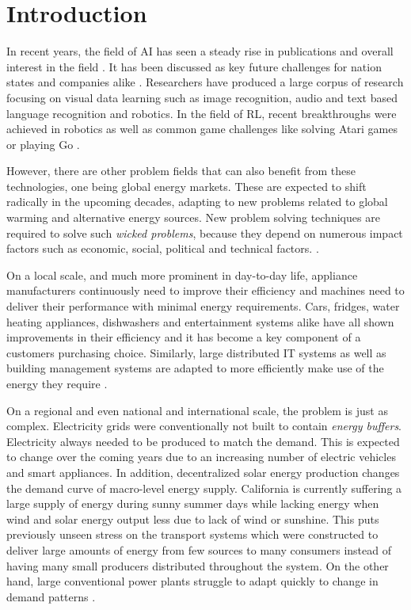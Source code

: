 \chapter{Introduction}


In recent years, the field of \ac{AI} has seen a steady rise in publications and overall interest in the field
\cite[]{arulkumaran2017brief, russell2016artificial}.
It has been discussed as key future challenges for nation states and companies alike
\cite[]{mozur_markoff_2017, faznetchina_2018}. Researchers have produced a large corpus of research focusing on visual
data learning such as image recognition, audio and text based language recognition and robotics. In the field of
\ac{RL}, recent breakthroughs were achieved in robotics as well as common game challenges like solving Atari games or
playing Go
\cite[]{arulkumaran2017brief}.

However, there are other problem fields that can also benefit from these technologies, one being global energy markets.
These are expected to shift radically in the upcoming decades, adapting to new problems related to global warming and
alternative energy sources. New problem solving techniques are required to solve such \emph{wicked
problems}, because they depend on numerous impact factors such as economic, social, political and technical factors.
\cite[]{ketter2015competitive}.

On a local scale, and much more prominent in day-to-day life, appliance manufacturers continuously need to improve their
efficiency and machines need to deliver their performance with minimal energy requirements. Cars, fridges, water heating
appliances, dishwashers and entertainment systems alike have all shown improvements in their efficiency and it has
become a key component of a customers purchasing choice.  Similarly, large distributed IT systems as well as building
management systems are adapted to more efficiently make use of the energy they require
\cite[]{Orgerie:2014:STI:2597757.2532637, DePaola:2014:IMS:2620784.2611779}.

On a regional and even national and international scale, the problem is just as complex. Electricity grids were
conventionally not built to contain \emph{energy buffers}. Electricity always needed to be produced to match the demand. This
is expected to change over the coming years due to an increasing number of electric vehicles and smart appliances. In
addition, decentralized solar energy production changes the demand curve of macro-level energy supply. California is
currently suffering a large supply of energy during sunny summer days while lacking energy when wind and solar energy
output less due to lack of wind or sunshine. This puts previously unseen stress on the transport systems which were
constructed to deliver large amounts of energy from few sources to many consumers instead of having many small producers
distributed throughout the system. On the other hand, large conventional power plants struggle to adapt quickly to
change in demand patterns
\cite[]{roberts_2016}.

